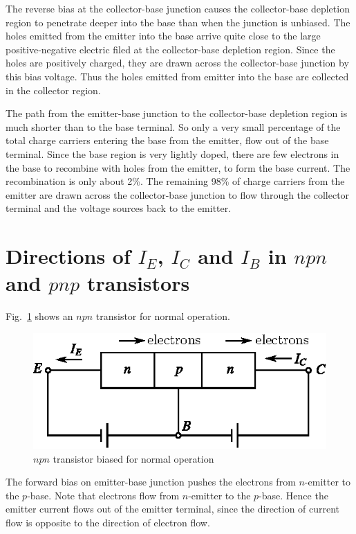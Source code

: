 The reverse bias at the collector-base junction causes the collector-base depletion region to penetrate deeper into the base than when the junction is unbiased. The holes emitted from the emitter into the base arrive quite close to the large positive-negative electric filed at the collector-base depletion region. Since the holes are positively charged, they are drawn across the collector-base junction by this bias voltage. Thus the holes emitted from emitter into the base are collected in the collector region.

The path from the emitter-base junction to the collector-base depletion region is much shorter than to the base terminal. So only a very small percentage of the total charge carriers entering the base from the emitter, flow out of the base terminal. Since the base region is very lightly doped, there are few electrons in the base to recombine with holes from the emitter, to form the base current. The recombination is only about 2\%. The remaining 98\% of charge carriers from the emitter are drawn across the collector-base junction to flow through the collector terminal and the voltage sources back to the emitter.

\section[Directions of $I_{E}$, $I_{C}$ and $I_{B}$ in $npn$ and $pnp$ transistors]{Directions of \boldmath$I_{E}$, $I_{C}$ and $I_{B}$ in $npn$ and $pnp$ transistors}\label{sec3.5}

Fig.~\ref{fig3.7} shows an $npn$ transistor for normal operation.
\begin{figure}[H]
\centering
\includegraphics{chap2/fig2.7.eps}
\caption{$npn$ transistor biased for normal operation}\label{fig3.7}
\end{figure}

The forward bias on emitter-base junction pushes the electrons from $n$-emitter to the $p$-base. Note that electrons flow from $n$-emitter to the $p$-base. Hence the emitter current flows out of the emitter terminal, since the direction of current flow is opposite to the direction of electron flow.

